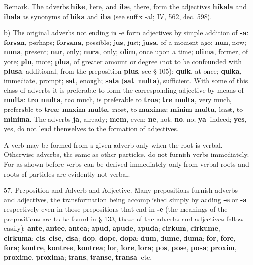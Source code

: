 \small Remark. The adverbs \textbf{hike}, here, and \textbf{ibe}, there, form the adjectives \textbf{hikala} and \textbf{ibala} as synonyms of \textbf{hika} and \textbf{iba} (see suffix -al; IV, 562, dec. 598). \normalsize

b) The original adverbs not ending in -e form adjectives by simple addition of \textbf{-a}: \textbf{forsan}, perhaps; \textbf{forsana}, possible; \textbf{jus}, just; \textbf{jusa}, of a moment ago; \textbf{nun}, now; \textbf{nuna}, present; \textbf{nur}, only; \textbf{nura}, only; \textbf{olim}, once upon a time; \textbf{olima}, former, of yore; \textbf{plu}, more; \textbf{plua}, of greater amount or degree (not to be confounded with \textbf{plusa}, additional, from the preposition \textbf{plus}, see § 105); \textbf{quik}, at once; \textbf{quika}, immediate, prompt; \textbf{sat}, enough; \textbf{sata} (\textbf{sat multa}), sufficient. With some of this class of adverbs it is preferable to form the corresponding adjective by means of \textbf{multa}: \textbf{tro multa}, too much, is preferable to \textbf{troa}; \textbf{tre multa}, very much, preferable to \textbf{trea}; \textbf{maxim multa}, most, to \textbf{maxima}; \textbf{minim multa}, least, to \textbf{minima}. The adverbs \textbf{ja}, already; \textbf{mem}, even; \textbf{ne}, not; \textbf{no}, no; \textbf{ya}, indeed; \textbf{yes}, yes, do not lend themselves to the formation of adjectives. 

A verb may be formed from a given adverb only when the root is verbal. Otherwise adverbs, the same as other particles, do not furnish verbs immediately. For as shown before verbs can be derived immediately only from verbal roots and roots of particles are evidently not verbal. 

57. Preposition and Adverb and Adjective. Many prepositions furnish adverbs and adjectives, the transformation being accomplished simply by adding \textbf{-e} or \textbf{-a} respectively even in those prepositions that end in \textbf{-e} (the meanings of the prepositions are to be found in § 133, those of the adverbs and adjectives follow easily): \textbf{ante}, \textbf{antee}, \textbf{antea}; \textbf{apud}, \textbf{apude}, \textbf{apuda}; \textbf{cirkum}, \textbf{cirkume}, \textbf{cirkuma}; \textbf{cis}, \textbf{cise}, \textbf{cisa}; \textbf{dop}, \textbf{dope}, \textbf{dopa}; \textbf{dum}, \textbf{dume}, \textbf{duma}; \textbf{for}, \textbf{fore}, \textbf{fora}; \textbf{kontre}, \textbf{kontree}, \textbf{kontrea}; \textbf{lor}, \textbf{lore}, \textbf{lora}; \textbf{pos}, \textbf{pose}, \textbf{posa}; \textbf{proxim}, \textbf{proxime}, \textbf{proxima}; \textbf{trans}, \textbf{transe}, \textbf{transa}; etc. 

